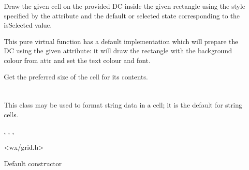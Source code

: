Draw the given cell on the provided DC inside the given rectangle
using the style specified by the attribute and the default or selected
state corresponding to the isSelected value.

This pure virtual function has a default implementation which will
prepare the DC using the given attribute: it will draw the rectangle
with the background colour from attr and set the text colour and font.

\label{wxgridcellrenderergetbestsize}


Get the preferred size of the cell for its contents.

\label{wxgridcellrendererclone}


\section{}\label{wxgridcellstringrenderer}

This class may be used to format string data in a cell; it is the default
for string cells.




,\rtfsp
{},\rtfsp
{},\rtfsp
{}


<wx/grid.h>


\label{wxgridcellstringrendererconstr}


Default constructor



